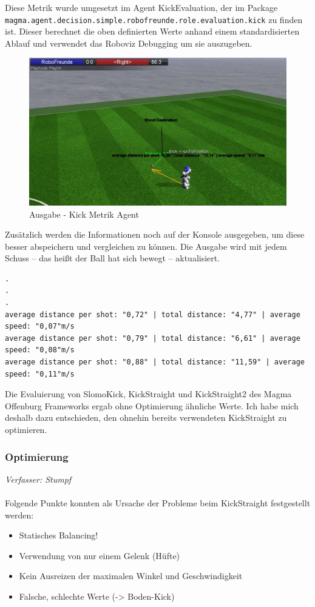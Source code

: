\documentclass[fontsize=12pt,a4paper,final]{scrartcl}[2003/01/01]
\makeatletter
\def\ScaleIfNeeded{%
	\ifdim\Gin@nat@width>\linewidth
		\linewidth
	\else
		\Gin@nat@width
	\fi
}
\makeatother
\begin{document}
Diese Metrik wurde umgesetzt im Agent KickEvaluation, der im Package\\ \texttt{magma.agent.decision.simple.robofreunde.role.evaluation.kick} zu finden ist. Dieser berechnet die oben definierten Werte anhand einem standardisierten Ablauf und verwendet das Roboviz Debugging um sie auszugeben.		

\begin{figure}[H]
	\centering
	\includegraphics[width=\ScaleIfNeeded]{Grafiken/Kick/KickMetrikAgent}
	\caption{Ausgabe - Kick Metrik Agent}
	\label{KickMetrikAgent}
\end{figure}

Zusätzlich werden die Informationen noch auf der Konsole ausgegeben, um diese besser abspeichern und vergleichen zu können. Die Ausgabe wird mit jedem Schuss -- das hei{\ss}t der Ball hat sich bewegt -- aktualisiert.

\begin{lstlisting}[caption=Kick Metrik Konsolenausgabe, captionpos=b, label=lst:KickMetricConsoleOutput]
.
.
.
average distance per shot: "0,72" | total distance: "4,77" | average speed: "0,07"m/s
average distance per shot: "0,79" | total distance: "6,61" | average speed: "0,08"m/s
average distance per shot: "0,88" | total distance: "11,59" | average speed: "0,11"m/s
\end{lstlisting}

Die Evaluierung von SlomoKick, KickStraight und KickStraight2 des Magma Offenburg Frameworks ergab ohne Optimierung ähnliche Werte. Ich habe mich deshalb dazu entschieden, den ohnehin bereits verwendeten KickStraight zu optimieren.

\subsubsection{Optimierung}
\textit{Verfasser: Stumpf}\\
\\
Folgende Punkte konnten als Ursache der Probleme beim KickStraight festgestellt werden:
\begin{itemize}
\item Statisches Balancing!
\item Verwendung von nur einem Gelenk (Hüfte)
\item Kein Ausreizen der maximalen Winkel und Geschwindigkeit
\item Falsche, schlechte Werte (-> Boden-Kick)
\end{itemize}
\end{document}

